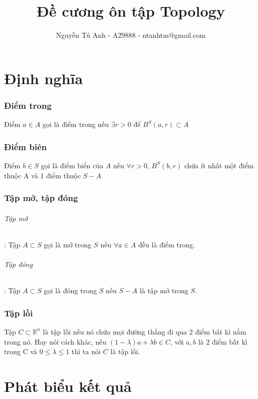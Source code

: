 \documentclass[12pt]{article}
\begin{document}
 
 
    \title{Đề cương ôn tập Topology}
    \author{Nguyễn Tú Anh - A29888 - ntanhtm@gmail.com}

    \maketitle
    \part{Định nghĩa}
        \section{Điểm trong}
            Điểm $a \in A$ gọi là điểm trong nếu $\exists r > 0 $ để $B^S(a,r) \subset A$          
        \section{Điểm biên}
            Điểm $b \in S$ gọi là điểm biển của $A$ nếu $\forall r > 0$, $B^S(b,r)$  chứa ít nhất một điểm thuộc A và 1 điểm thuộc $S - A$
        \section{Tập mở, tập đóng}
            \paragraph{Tập mở}: Tập $A \subset S$ gọi là mở trong $S$ nếu $\forall a \in A$ đều là điểm trong.
            \paragraph{Tập đóng}: Tập $A \subset S$ gọi là đóng trong $S$ nếu $S - A$ là tập mở trong $S$.
        \section{Tập lồi}
            Tập $C \subset \mathbb{R}^n$ là tập lồi nếu nó chứa mọi đường thẳng đi qua 2 điểm bất kì nằm trong nó.
            Hay nói cách khác, nếu $(1- \lambda)a + \lambda b \in C$, với $a,b$ là 2 điểm bất kì trong C và $0 \leq \lambda \leq 1$ thì ta nói $C$ là tập lồi. 
    \newpage
    \part{Phát biểu kết quả}
\end{document}
